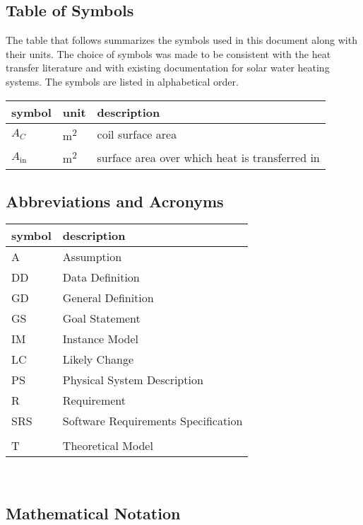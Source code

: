 \documentclass[12pt]{article}
\begin{document}
\subsection{Table of Symbols}

The table that follows summarizes the symbols used in this document along with
their units.  The choice of symbols was made to be consistent with the heat
transfer literature and with existing documentation for solar water heating
systems.  The symbols are listed in alphabetical order.

\renewcommand{\arraystretch}{1.2}
\noindent \begin{longtable*}{l l p{12cm}} \toprule
\textbf{symbol} & \textbf{unit} & \textbf{description}\\
\midrule 
$A_C$ & \si[per-mode=symbol] {\square\metre} & coil surface area
\\
$A_\text{in}$ & \si[per-mode=symbol] {\square\metre} & surface area over 
which heat is transferred in
\\ 
\bottomrule
\end{longtable*}

\subsection{Abbreviations and Acronyms}

\renewcommand{\arraystretch}{1.2}
\begin{tabular}{l l} 
  \toprule		
  \textbf{symbol} & \textbf{description}\\
  \midrule 
  A & Assumption\\
  DD & Data Definition\\
  GD & General Definition\\
  GS & Goal Statement\\
  IM & Instance Model\\
  LC & Likely Change\\
  PS & Physical System Description\\
  R & Requirement\\
  SRS & Software Requirements Specification\\
  \progname{} & \\
  T & Theoretical Model\\
  \bottomrule
\end{tabular}\\

\subsection{Mathematical Notation}
\end{document}
